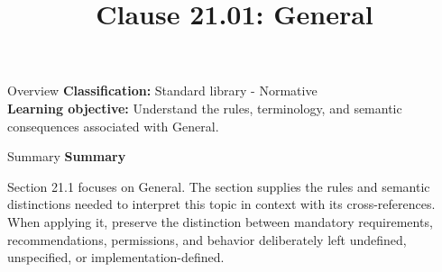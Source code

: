 \documentclass[10pt,letterpaper]{article}
\title{Clause 21.01: General}
\author{}
\date{}
\begin{document}
\maketitle
\begin{CornellOverviewBox}{Overview}
\textbf{Classification:} Standard library - Normative\\[2pt]
\textbf{Learning objective:} Understand the rules, terminology, and semantic consequences associated with General.
\end{CornellOverviewBox}\begin{CornellSummaryBox}{Summary}
{\sffamily\bfseries\color{Accent} Summary}\par\vspace{3pt}Section 21.1 focuses on General. The section supplies the rules and semantic distinctions needed to interpret this topic in context with its cross-references. When applying it, preserve the distinction between mandatory requirements, recommendations, permissions, and behavior deliberately left undefined, unspecified, or implementation-defined.
\end{CornellSummaryBox}
\end{document}
